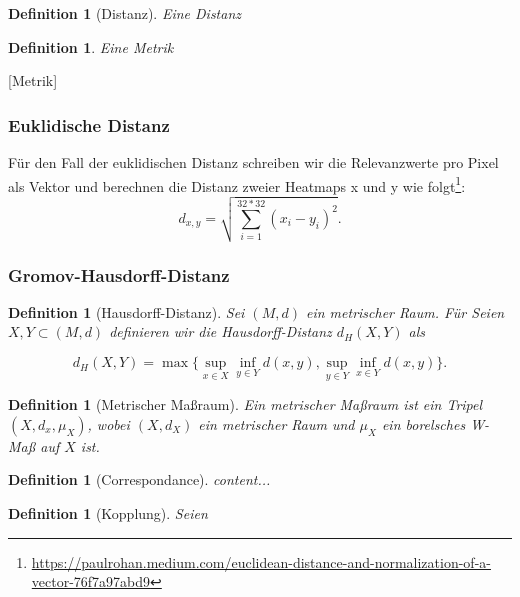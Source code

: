 \documentclass[twoside, 12pt,a4paper]{article}
\def\emph#1{\textit{#1}}
\newtheorem{definition}[theorem]{Definition}
\numberwithin{equation}{section}
\begin{document}
	\begin{definition}[Distanz]
		Eine \emph{Distanz}
	\end{definition}
	\begin{definition}
		Eine \emph{Metrik}
	\end{definition}[Metrik]

	
	
	\subsubsection{Euklidische Distanz} \label{l2dist}
	Für den Fall der euklidischen Distanz schreiben wir die Relevanzwerte pro Pixel als Vektor und berechnen die Distanz zweier Heatmaps x und y wie folgt\footnote{\url{https://paulrohan.medium.com/euclidean-distance-and-normalization-of-a-vector-76f7a97abd9}}:
	$$ d_{x,y} = \sqrt{\sum_{i=1}^{32 * 32}{(x_i -y_i)^2}}.$$
	
	\subsubsection{Gromov-Hausdorff-Distanz}
	
	\begin{definition}[Hausdorff-Distanz]
		Sei $(M,d)$ ein metrischer Raum.
		Für 
		Seien $X,Y \subset (M,d)$ definieren wir die \emph{Hausdorff-Distanz} $d_H(X,Y)$ als
		
		\begin{equation}
			d_H(X,Y) = \max \lbrace \sup_{x \in X} \inf_{y \in Y} d(x,y), \sup_{y \in Y} \inf_{x \in Y} d(x,y) \rbrace .
		\end{equation} 
		
	\end{definition}

	\begin{definition}[Metrischer Maßraum]
	Ein \emph{metrischer Maßraum} ist ein Tripel $(X,d_x,\mu_X)$, wobei $(X,d_X)$ ein metrischer Raum und $\mu_X$ ein borelsches W-Maß auf $X$ ist.
	\end{definition}

	\begin{definition}[Correspondance]
		content...
	\end{definition}

	\begin{definition}[Kopplung]
	Seien 
	\end{definition}
	
\end{document}
